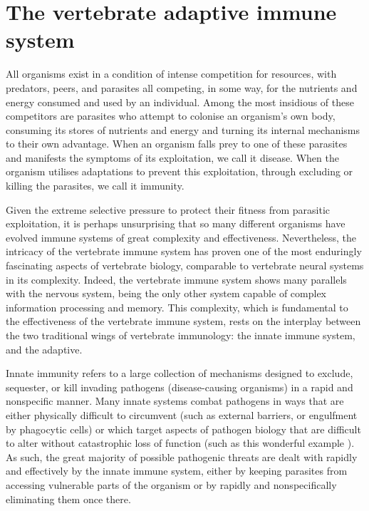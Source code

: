 \section{The vertebrate adaptive immune system} %

All organisms exist in a condition of intense competition for resources, with predators, peers, and parasites all competing, in some way, for the nutrients and energy consumed and used by an individual. Among the most insidious of these competitors are parasites who attempt to colonise an organism's own body, consuming its stores of nutrients and energy and turning its internal mechanisms to their own advantage. When an organism falls prey to one of these parasites and manifests the symptoms of its exploitation, we call it disease. When the organism utilises adaptations to prevent this exploitation, through excluding or killing the parasites, we call it immunity.

Given the extreme selective pressure to protect their fitness from parasitic exploitation, it is perhaps unsurprising that so many different organisms have evolved immune systems of great complexity and effectiveness. Nevertheless, the intricacy of the vertebrate immune system has proven one of the most enduringly fascinating aspects of vertebrate biology, comparable to vertebrate neural systems in its complexity. Indeed, the vertebrate immune system shows many parallels with the nervous system, being the only other system capable of complex information processing and memory. This complexity, which is fundamental to the effectiveness of the vertebrate immune system, rests on the interplay between the two traditional wings of vertebrate immunology: the innate immune system, and the adaptive.

Innate immunity refers to a large collection of mechanisms designed to exclude, sequester, or kill invading pathogens (disease-causing organisms) in a rapid and nonspecific manner. Many innate systems combat pathogens in ways that are either physically difficult to circumvent (such as external barriers, or engulfment by phagocytic cells) or which target aspects of pathogen biology that are difficult to alter without catastrophic loss of function (such as this wonderful example %
). As such, the great majority of possible pathogenic threats are dealt with rapidly and effectively by the innate immune system, either by keeping parasites from accessing vulnerable parts of the organism or by rapidly and nonspecifically eliminating them once there.

